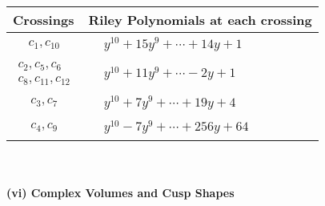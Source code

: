 \documentclass[1p]{elsarticle_modified}
\theoremstyle{definition}
\begin{document}
\begin{tabular}{m{50pt}|m{274pt}}
Crossings & \hspace{64pt}Riley Polynomials at each crossing \\
\hline $$\begin{aligned}c_{1},c_{10}\end{aligned}$$&$\begin{aligned}
&y^{10}+15 y^9+\cdots+14 y+1
\end{aligned}$\\
\hline $$\begin{aligned}c_{2},c_{5},c_{6}\\c_{8},c_{11},c_{12}\end{aligned}$$&$\begin{aligned}
&y^{10}+11 y^9+\cdots-2 y+1
\end{aligned}$\\
\hline $$\begin{aligned}c_{3},c_{7}\end{aligned}$$&$\begin{aligned}
&y^{10}+7 y^9+\cdots+19 y+4
\end{aligned}$\\
\hline $$\begin{aligned}c_{4},c_{9}\end{aligned}$$&$\begin{aligned}
&y^{10}-7 y^9+\cdots+256 y+64
\end{aligned}$\\
\hline
\end{tabular}\\~\\
\newpage\flushleft \textbf{(vi) Complex Volumes and Cusp Shapes}
\end{document}

